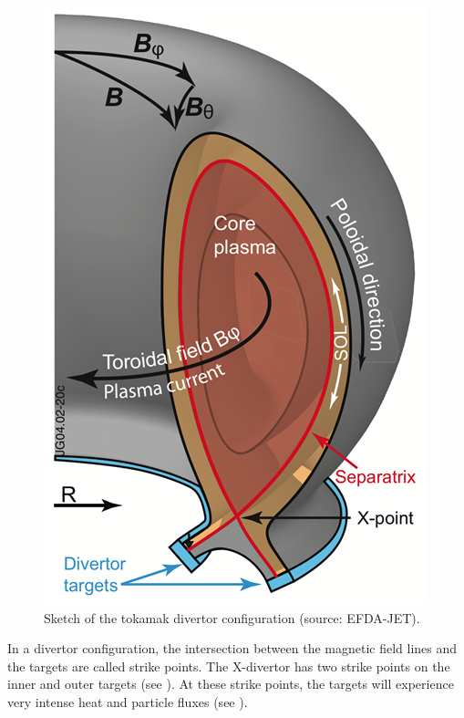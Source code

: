 \begin{figure} [h]
    \centering
    \includegraphics[width=0.5\linewidth]{Figures/Chapter1/sketch_divertor.png}
    \caption{Sketch of the tokamak divertor configuration (source: EFDA-JET).}
\end{figure}

In a divertor configuration, the intersection between the magnetic field lines and the targets are called strike points.
The X-divertor has two strike points on the inner and outer targets (see ).
At these strike points, the targets will experience very intense heat and particle fluxes (see ).

